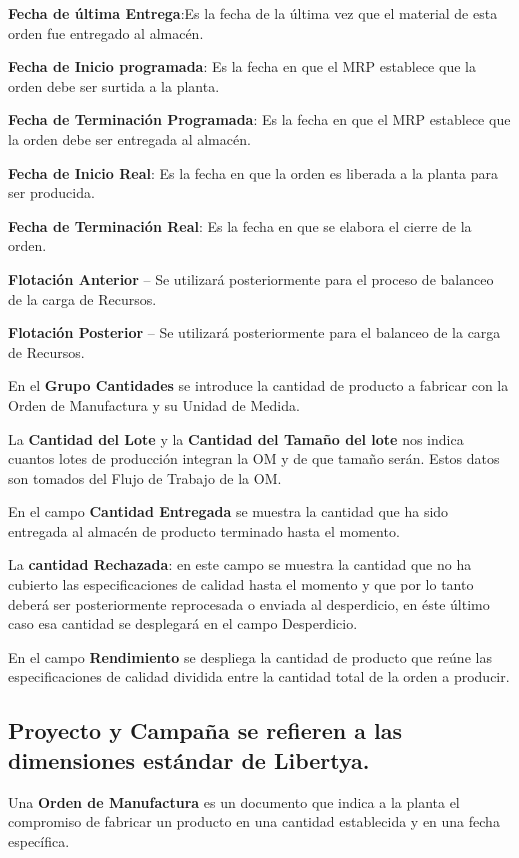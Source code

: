 \documentclass[letterpaper,10pt,spanish]{sphinxmanual}
\begin{document}
\textbf{Fecha de última Entrega}:Es la fecha de la última vez que el material de esta orden
fue entregado al almacén.

\textbf{Fecha de Inicio programada}: Es la fecha en que el MRP establece que la orden
debe ser surtida a la planta.

\textbf{Fecha de Terminación Programada}: Es la fecha en que el MRP establece que la
orden debe ser entregada al almacén.

\textbf{Fecha de Inicio Real}: Es la fecha en que la orden es liberada a la planta para ser
producida.

\textbf{Fecha de Terminación Real}: Es la fecha en que se elabora el cierre de la orden.

\textbf{Flotación Anterior} – Se utilizará posteriormente para el proceso de balanceo de la
carga de Recursos.

\textbf{Flotación Posterior} – Se utilizará posteriormente para el balanceo de la carga de
Recursos.

En el \textbf{Grupo Cantidades} se introduce la cantidad de producto a fabricar con  la Orden de Manufactura y su Unidad de Medida.

La \textbf{Cantidad del Lote} y la \textbf{Cantidad del Tamaño del lote} nos indica cuantos lotes de producción integran la OM y de que tamaño serán. Estos datos son tomados del Flujo de Trabajo de la OM.

En el campo \textbf{Cantidad Entregada} se muestra la cantidad que ha sido entregada al almacén de producto terminado hasta el momento.

La \textbf{cantidad Rechazada}: en este campo se muestra la cantidad que no ha cubierto las  especificaciones  de  calidad  hasta  el  momento  y  que  por  lo  tanto  deberá  ser posteriormente  reprocesada  o  enviada  al  desperdicio,  en  éste  último  caso  esa cantidad se desplegará en el campo Desperdicio.

En  el  campo \textbf{Rendimiento} se  despliega  la  cantidad  de  producto  que  reúne  las especificaciones de calidad dividida entre la cantidad total de la orden a producir.


\subsection{\textbf{Proyecto y Campaña} se refieren a las dimensiones estándar de Libertya.}
\label{manufactura-om:proyecto-y-campana-se-refieren-a-las-dimensiones-estandar-de-libertya}
Una \textbf{Orden de Manufactura} es un documento que indica a la planta el compromiso de fabricar un producto en una cantidad establecida y en una fecha específica.
\end{document}
